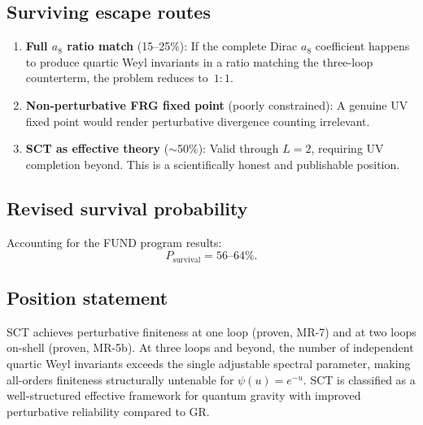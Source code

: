 \documentclass[12pt,a4paper]{article}
\begin{document}
\subsection{Surviving escape routes}
\begin{enumerate}
  \item \textbf{Full $a_8$ ratio match} (15--25\%): If the complete Dirac $a_8$
    coefficient happens to produce quartic Weyl invariants in a ratio matching
    the three-loop counterterm, the problem reduces to~$1{:}1$.
  \item \textbf{Non-perturbative FRG fixed point} (poorly constrained):
    A genuine UV fixed point would render perturbative divergence counting
    irrelevant.
  \item \textbf{SCT as effective theory} ($\sim$50\%): Valid through $L=2$,
    requiring UV completion beyond.  This is a scientifically honest and
    publishable position.
\end{enumerate}

\subsection{Revised survival probability}
Accounting for the FUND program results:
\[
  P_{\mathrm{survival}} = 56\text{--}64\%.
\]

\subsection{Position statement}
SCT achieves perturbative finiteness at one loop (proven, MR-7) and at two loops
on-shell (proven, MR-5b).  At three loops and beyond, the number of independent
quartic Weyl invariants exceeds the single adjustable spectral parameter, making
all-orders finiteness structurally untenable for $\psi(u) = e^{-u}$.  SCT is
classified as a well-structured effective framework for quantum gravity with
improved perturbative reliability compared to GR.
\end{document}
